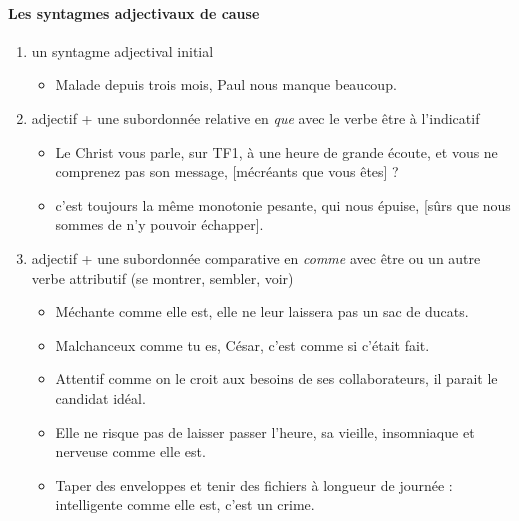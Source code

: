 \documentclass[UTF8]{report}
\begin{document}
\paragraph{Les syntagmes adjectivaux de cause}
\begin{enumerate}
    \item un syntagme adjectival initial 
    \begin{itemize}
        \item Malade depuis trois mois, Paul nous manque beaucoup.
    \end{itemize}
    \item adjectif + une subordonnée relative en \textit{que} avec le verbe être à l’indicatif
    \begin{itemize}
        \item Le Christ vous parle, sur TF1, à une heure de grande écoute, et vous ne comprenez pas son message, [mécréants que vous êtes] ?
        \item c’est toujours la même monotonie pesante, qui nous épuise, [sûrs que nous sommes de n’y pouvoir échapper]. 
    \end{itemize}
    \item adjectif + une subordonnée comparative en \textit{comme} avec être ou un autre verbe attributif (se montrer, sembler, voir)
    \begin{itemize}
        \item Méchante comme elle est, elle ne leur laissera pas un sac de ducats.
        \item Malchanceux comme tu es, César, c’est comme si c’était fait.
        \item Attentif comme on le croit aux besoins de ses collaborateurs, il parait le candidat idéal.
        \item Elle ne risque pas de laisser passer l’heure, sa vieille, insomniaque et nerveuse comme elle est.
        \item Taper des enveloppes et tenir des fichiers à longueur de journée : intelligente comme elle est, c’est un crime.
    \end{itemize}
\end{enumerate}
\end{document}
